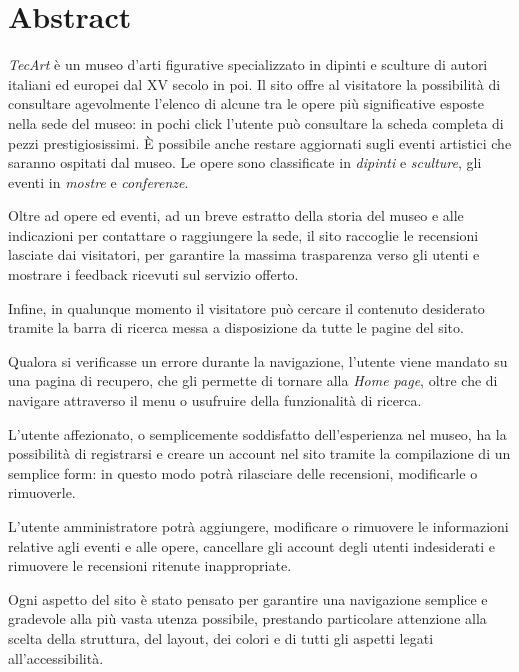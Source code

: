 \section{Abstract}
\label{abstract}
\textit{TecArt} è un museo d'arti figurative specializzato in dipinti e sculture di autori italiani ed europei dal XV secolo in poi. Il sito offre al visitatore la possibilità di consultare agevolmente l'elenco di alcune tra le opere più significative esposte nella sede del museo: in pochi click l'utente può consultare la scheda completa di pezzi prestigiosissimi. È possibile anche restare aggiornati sugli eventi artistici che saranno ospitati dal museo. Le opere sono classificate in \textit{dipinti} e \textit{sculture}, gli eventi in \textit{mostre} e \textit{conferenze}.

Oltre ad opere ed eventi, ad un breve estratto della storia del museo e alle indicazioni per contattare o raggiungere la sede, il sito raccoglie le recensioni lasciate dai visitatori, per garantire la massima trasparenza verso gli utenti e mostrare i feedback ricevuti sul servizio offerto.

Infine, in qualunque momento il visitatore può cercare il contenuto desiderato tramite la barra di ricerca messa a disposizione da tutte le pagine del sito.

Qualora si verificasse un errore durante la navigazione, l'utente viene mandato su una pagina di recupero, che gli permette di tornare alla \textit{Home page}, oltre che di navigare attraverso il menu o usufruire della funzionalità di ricerca.

L'utente affezionato, o semplicemente soddisfatto dell'esperienza nel museo, ha la possibilità di registrarsi e creare un account nel sito tramite la compilazione di un semplice form: in questo modo potrà rilasciare delle recensioni, modificarle o rimuoverle.

L'utente amministratore potrà aggiungere, modificare o rimuovere le informazioni relative agli eventi e alle opere, cancellare gli account degli utenti indesiderati e rimuovere le recensioni ritenute inappropriate.

Ogni aspetto del sito è stato pensato per garantire una navigazione semplice e gradevole alla più vasta utenza possibile, prestando particolare attenzione alla scelta della struttura, del layout, dei colori e di tutti gli aspetti legati all'accessibilità.